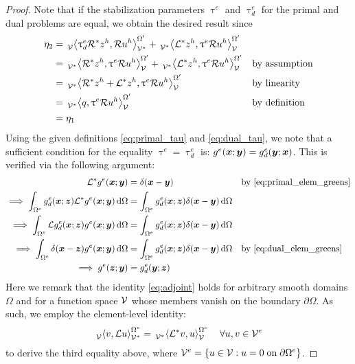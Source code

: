 \begin{proof}
Note that if the stabilization parameters $\uptau^e$ and
$\uptau^e_d$ for the primal and dual problems are equal,
we obtain the desired result since
%
\begin{gather*}
\begin{aligned}
\eta_2 &= 
\,{}_{\mathcal{V}}^{}\!\left< {\uptau^e_d \mathcal{R}^* z^h}, {\mathcal{R} u^h} \right>_{\mathcal{V}^*}^{\Omega'} +
\,{}_{\mathcal{V}^*}^{}\!\left< {\mathcal{L}^* z^h}, {\uptau^e \mathcal{R} u^h} \right>_{\mathcal{V}}^{\Omega'}
&&\\
&= \,{}_{\mathcal{V}^*}^{}\!\left< {\mathcal{R}^* z^h}, {\uptau^e \mathcal{R} u^h} \right>_{\mathcal{V}}^{\Omega'} +
\,{}_{\mathcal{V}^*}^{}\!\left< {\mathcal{L}^* z^h}, {\uptau^e \mathcal{R} u^h} \right>_{\mathcal{V}}^{\Omega'}
&&\text{by assumption} \\
&= \,{}_{\mathcal{V}^*}^{}\!\left< {\mathcal{R}^* z^h + \mathcal{L}^* z^h}, {\uptau^e \mathcal{R} u^h} \right>_{\mathcal{V}}^{\Omega'}
&&\text{by linearity} \\
&= \,{}_{\mathcal{V}^*}^{}\!\left< {q}, {\uptau^e \mathcal{R} u^h} \right>_{\mathcal{V}}^{\Omega'}
&&\text{by definition} \\
&= \eta_1
&&
\end{aligned}
\end{gather*}
%
Using the given definitions \eqref{eq:primal_tau}
and \eqref{eq:dual_tau}, we note that a sufficient
condition for the equality $\uptau^e = \uptau^e_d$
is:
$g^e(\boldsymbol{x}; \boldsymbol{y}) = g^e_d(\boldsymbol{y}; \boldsymbol{x})$.
This is verified via the following argument:
%
\begin{gather*}
\begin{aligned}
\mathcal{L}^* g^e(\boldsymbol{x}; \boldsymbol{y})
&=
\delta(\boldsymbol{x} - \boldsymbol{y})
&& \text{by \eqref{eq:primal_elem_greens}} \\
\implies
\int_{\Omega^e}
g^e_d(\boldsymbol{x}; \boldsymbol{z}) \mathcal{L}^* g^e(\boldsymbol{x}; \boldsymbol{y})
\, \text{d} \Omega
&=
\int_{\Omega^e}
g^e_d(\boldsymbol{x}; \boldsymbol{z}) \delta(\boldsymbol{x} - \boldsymbol{y})
\, \text{d} \Omega
&& \\
\implies
\int_{\Omega^e}
\mathcal{L} g^e_d(\boldsymbol{x}; \boldsymbol{z}) g^e(\boldsymbol{x}; \boldsymbol{y})
\, \text{d} \Omega
&=
\int_{\Omega^e}
g^e_d(\boldsymbol{x}; \boldsymbol{z}) \delta(\boldsymbol{x} - \boldsymbol{y})
\, \text{d} \Omega
&& \\
\implies
\int_{\Omega^e}
\delta(\boldsymbol{x} - \boldsymbol{z}) g^e(\boldsymbol{x}; \boldsymbol{y})
\, \text{d} \Omega
&=
\int_{\Omega^e}
g^e_d(\boldsymbol{x}; \boldsymbol{z}) \delta(\boldsymbol{x} - \boldsymbol{y})
\, \text{d} \Omega
&& \text{by \eqref{eq:dual_elem_greens}} \\
\implies
g^e(\boldsymbol{z}; \boldsymbol{y}) &= g^e_d(\boldsymbol{y}; \boldsymbol{z})
\end{aligned}
\end{gather*}
%
Here we remark that the identity \eqref{eq:adjoint}
holds for arbitrary smooth domains $\Omega$ and for
a function space $\mathcal{V}$ whose members vanish on the
boundary $\partial \Omega$. As such,
we employ the element-level identity:
%
\begin{gather}
\,{}_{\mathcal{V}}^{}\!\left< {v}, {\mathcal{L} u} \right>_{\mathcal{V}^*}^{\Omega^e} =
\,{}_{\mathcal{V}^*}^{}\!\left< {\mathcal{L}^*v}, {u} \right>_{\mathcal{V}}^{\Omega^e}
\quad \forall u,v \in \mathcal{V}^e
\end{gather}
%
to derive the third equality above, where
$\mathcal{V}^e = \{ u \in \mathcal{V} : u = 0 \; \text{on} \; \partial \Omega^e \}$.
\end{proof}

